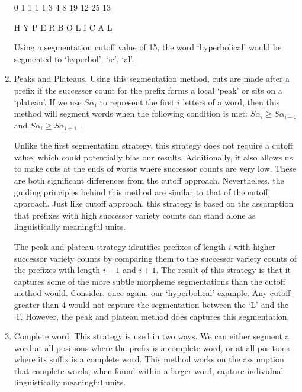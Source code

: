 \documentclass[11pt,letterpaper]{article}
\begin{document}
\begin{enumerate}
\hfill 0 \hfill \hfill 1 \hfill \hfill 1 \hfill \hfill 1 \hfill \hfill 1 \hfill \hfill 3 \hfill \hfill 4 \hfill \hfill 8 \hfill 19 \hfill 12 \hfill 25 \hfill 13 \hfill \hfill \par
\hfill \hfill H \hfill Y \hfill P \hfill E \hfill R \hfill B \hfill O \hfill L \hfill I \hfill C \hfill A \hfill L \hfill \par
 
Using a segmentation cutoff value of 15, the word `hyperbolical' would be segmented to `hyperbol', `ic', `al'. \par

\item Peaks and Plateaus. Using this segmentation method, cuts are made after a prefix if the successor count for the prefix forms a local `peak' or sits on a `plateau'. If we use \(S\alpha_{i}\) to represent the first $i$ letters of a word, then this method will segment words when the following condition is met: \(S\alpha_{i} \geq S\alpha_{i-1}\) and \(S\alpha_{i} \geq S\alpha_{i+1}\) \cite{hafer1974-word}.\par

Unlike the first segmentation strategy, this strategy does not require a cutoff value, which could potentially bias our results. Additionally, it also allows us to make cuts at the ends of words where successor counts are very low. These are both significant differences from the cutoff approach. Nevertheless, the guiding principles behind this method are similar to that of the cutoff approach. Just like cutoff approach, this strategy is based on the assumption that prefixes with high successor variety counts can stand alone as linguistically meaningful units.

The peak and plateau strategy identifies prefixes of length $i$ with higher successor variety counts by comparing them to the successor variety counts of the prefixes with length $i-1$ and $i+1$. The result of this strategy is that it captures some of the more subtle morpheme segmentations than the cutoff method would. Consider, once again, our `hyperbolical' example. Any cutoff greater than 4 would not capture the segmentation between the `L' and the `I'. However, the peak and plateau method does captures this segmentation.

\item Complete word. This strategy is used in two ways. We can either segment a word at all positions where the prefix is a complete word, or at all positions where its suffix is a complete word. This method works on the assumption that complete words, when found within a larger word, capture individual linguistically meaningful units.


\end{enumerate}
\end{document}
